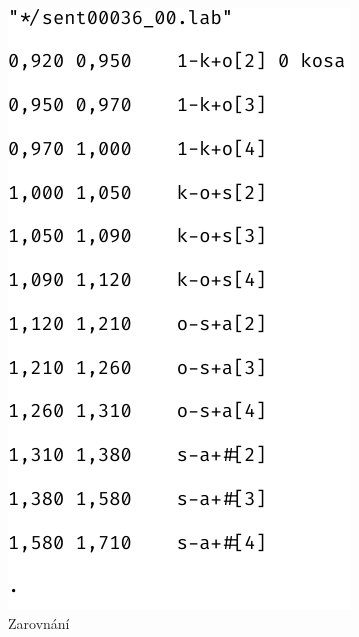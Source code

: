 \begin{figure}[htpb]
  \centering
  \begin{subfigure}[b]{0.26\textwidth}
    \includegraphics[width=\textwidth]{./ch6-realisation/img/alignment_text.pdf}
    \caption{Zarovnání}
    \label{fig:realisation:augmentation:alignemnt:wrong:text}
  \end{subfigure}
  \begin{subfigure}[b]{0.65\textwidth}

\end{subfigure}
\end{figure}
